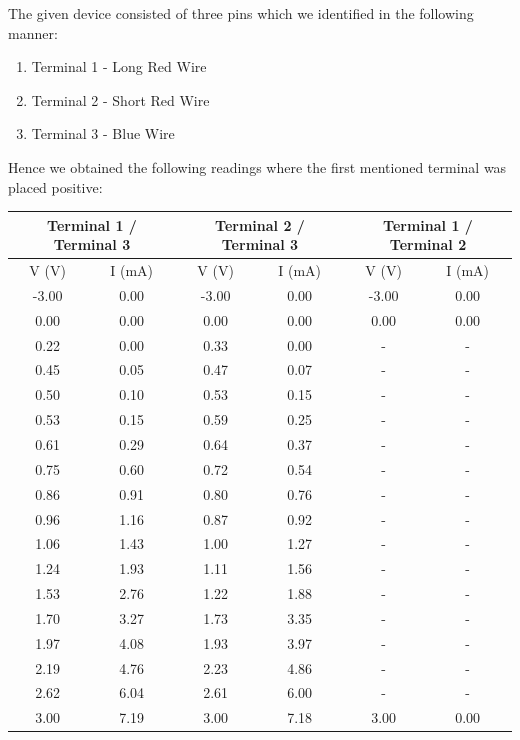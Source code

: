 \documentclass[12pt]{article}
\begin{document}
The given device consisted of three pins which we identified in the following manner:
\begin{enumerate}
	\item Terminal 1 - Long Red Wire
	\item Terminal 2 - Short Red Wire
	\item Terminal 3 - Blue Wire
\end{enumerate}
Hence we obtained the following readings where the first mentioned terminal was placed positive:
\begin{center}
 \begin{tabular}{|| c | c || c | c || c | c ||} 
 \hline
 \hline
 \multicolumn{2}{||c|}{Terminal 1 / Terminal 3} & \multicolumn{2}{c||}{Terminal 2 / Terminal 3} & \multicolumn{2}{c||}{Terminal 1 / Terminal 2} \\
 \hline
 \hline
V (V) & I (mA) & V (V) & I (mA) & V (V) & I (mA) \\ [0.25ex] 
 \hline\hline
-3.00 & 0.00 & -3.00 & 0.00 & -3.00 & 0.00 \\ \hline
0.00 & 0.00 & 0.00 & 0.00 & 0.00 & 0.00 \\ \hline
0.22 & 0.00 & 0.33 & 0.00 & - & - \\ \hline
0.45 & 0.05 & 0.47 & 0.07 & - & - \\ \hline
0.50 & 0.10 & 0.53 & 0.15 & - & - \\ \hline
0.53 & 0.15 & 0.59 & 0.25 & - & - \\ \hline
0.61 & 0.29 & 0.64 & 0.37 & - & - \\ \hline
0.75 & 0.60 & 0.72 & 0.54 & - & - \\ \hline
0.86 & 0.91 & 0.80 & 0.76 & - & - \\ \hline
0.96 & 1.16 & 0.87 & 0.92 & - & - \\ \hline
1.06 & 1.43 & 1.00 & 1.27 & - & - \\ \hline
1.24 & 1.93 & 1.11 & 1.56 & - & - \\ \hline
1.53 & 2.76 & 1.22 & 1.88 & - & - \\ \hline
1.70 & 3.27 & 1.73 & 3.35 & - & - \\ \hline
1.97 & 4.08 & 1.93 & 3.97 & - & - \\ \hline
2.19 & 4.76 & 2.23 & 4.86 & - & - \\ \hline
2.62 & 6.04 & 2.61 & 6.00 & - & - \\ \hline
3.00 & 7.19 & 3.00 & 7.18 & 3.00 & 0.00 \\ \hline
 \hline 
\end{tabular}
\end{center}
\end{document}
